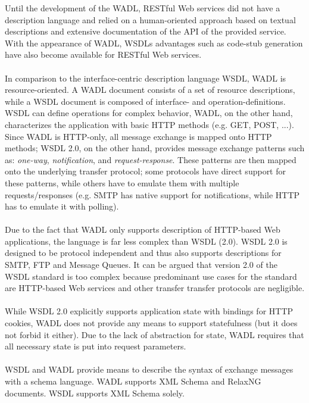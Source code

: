 Until the development of the WADL, RESTful Web services did not have a description language and relied on a human-oriented approach based on textual descriptions and extensive documentation of the API of the provided service. \cite{PROGRAMWEB} With the appearance of WADL, WSDLs advantages such as code-stub generation have also become available for RESTful Web services.
\\ \\
In comparison to the interface-centric description language WSDL, WADL is resource-oriented. A WADL document consists of a set of resource descriptions, while a WSDL document is composed of interface-  and operation-definitions.
\\
WSDL can define operations for complex behavior, WADL, on the other hand, characterizes the application with basic HTTP methods (e.g. GET, POST, ...). Since WADL is HTTP-only, all message exchange is mapped onto HTTP methods; WSDL 2.0, on the other hand, provides message exchange patterns such as: \emph{one-way}, \emph{notification}, and \emph{request-response}. These patterns are then mapped onto the underlying transfer protocol; some protocols have direct support for these patterns, while others have to emulate them with multiple requests/responses (e.g. SMTP has native support for notifications, while HTTP has to emulate it with polling).
\\ \\
Due to the fact that WADL only supports description of HTTP-based Web applications, the language is far less complex than WSDL (2.0). WSDL 2.0 is designed to be protocol independent and thus also supports descriptions for SMTP, FTP and Message Queues. It can be argued that version 2.0 of the WSDL standard is too complex because predominant use cases for the standard are HTTP-based Web services and other transfer transfer protocols are negligible. 
\\ \\
While WSDL 2.0 explicitly supports application state with bindings for HTTP cookies, WADL does not provide any means to support statefulness (but it does not forbid it either). Due to the lack of abstraction for state, WADL requires that all necessary state is put into request parameters. \cite{WADLWSDL}
\\ \\
WSDL and WADL provide means to describe the syntax of exchange messages with a schema language. WADL supports XML Schema and RelaxNG documents. WSDL supports XML Schema solely.